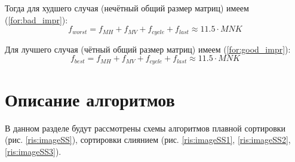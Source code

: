 Тогда для худшего случая (нечётный общий размер матриц) имеем (\ref{for:bad_impr}):
\begin{equation}
	\label{for:bad_impr}
	f_{worst} = f_{MH} + f_{MV} + f_{cycle} + f_{last} \approx 11.5 \cdot MNK
\end{equation}

Для лучшего случая (чётный общий размер матриц) имеем (\ref{for:good_impr}):
\begin{equation}
	\label{for:good_impr}
	f_{best} = f_{MH} + f_{MV} + f_{cycle} + f_{last} \approx 11.5 \cdot MNK
\end{equation}

\section{Описание алгоритмов}
В данном разделе будут рассмотрены схемы алгоритмов плавной сортировки (рис. \ref{ris:imageSS}), сортировки слиянием (рис. \ref{ris:imageSS1}, \ref{ris:imageSS2}, \ref{ris:imageSS3}).
